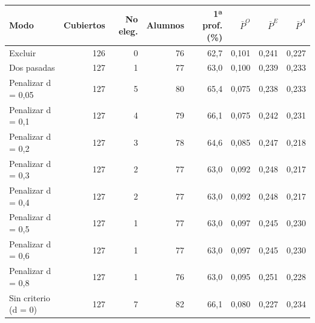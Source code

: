 \begin{tabular}{lrrrrrrr}
\toprule
\textbf{Modo} & \textbf{Cubiertos} & \textbf{No eleg.} & \textbf{Alumnos} & \textbf{1ª prof. (\%)} & \textbf{$\bar P^O$} & \textbf{$\bar P^E$} & \textbf{$\bar P^A$} \\
\midrule
Excluir & 126 & 0 & 76 & 62,7 & 0,101 & 0,241 & 0,227 \\
Dos pasadas & 127 & 1 & 77 & 63,0 & 0,100 & 0,239 & 0,233 \\
Penalizar d = 0,05 & 127 & 5 & 80 & 65,4 & 0,075 & 0,238 & 0,233 \\
Penalizar d = 0,1 & 127 & 4 & 79 & 66,1 & 0,075 & 0,242 & 0,231 \\
Penalizar d = 0,2 & 127 & 3 & 78 & 64,6 & 0,085 & 0,247 & 0,218 \\
Penalizar d = 0,3 & 127 & 2 & 77 & 63,0 & 0,092 & 0,248 & 0,217 \\
Penalizar d = 0,4 & 127 & 2 & 77 & 63,0 & 0,092 & 0,248 & 0,217 \\
Penalizar d = 0,5 & 127 & 1 & 77 & 63,0 & 0,097 & 0,245 & 0,230 \\
Penalizar d = 0,6 & 127 & 1 & 77 & 63,0 & 0,097 & 0,245 & 0,230 \\
Penalizar d = 0,8 & 127 & 1 & 76 & 63,0 & 0,095 & 0,251 & 0,228 \\
Sin criterio (d = 0) & 127 & 7 & 82 & 66,1 & 0,080 & 0,227 & 0,234 \\
\bottomrule
\end{tabular}
